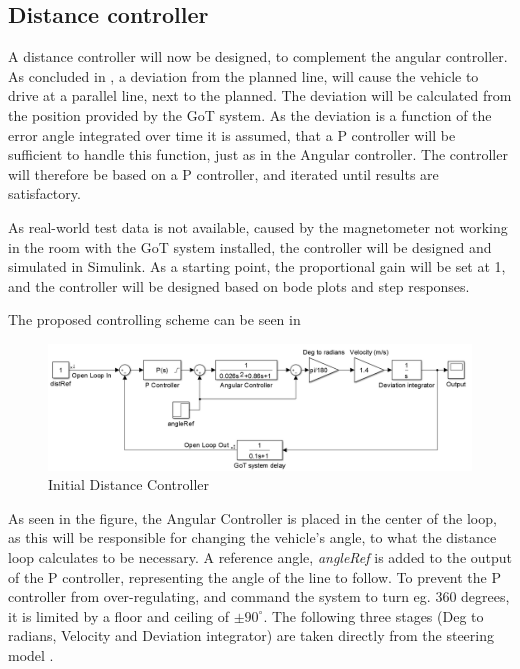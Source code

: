 \subsection{Distance controller}
A distance controller will now be designed, to complement the angular controller.
As concluded in , a deviation from the planned line, will cause the vehicle to drive at a parallel line, next to the planned. The deviation will be calculated from the position provided by the GoT system. As the deviation is a function of the error angle integrated over time it is assumed, that a P controller will be sufficient to handle this function, just as in the Angular controller. The controller will therefore be based on a P controller, and iterated until results are satisfactory. 

As real-world test data is not available, caused by the magnetometer not working in the room with the GoT system installed, the controller will be designed and simulated in Simulink. As a starting point, the proportional gain will be set at 1, and the controller will be designed based on bode plots and step responses.

The proposed controlling scheme can be seen in 

\begin{figure}[H]
\centering
\includegraphics[width=\textwidth]{figures/SteeringSimulink1.png} 
\caption{Initial Distance Controller}
\label{SteeringSimulink}
\end{figure}
As seen in the figure, the Angular Controller is placed in the center of the loop, as this will be responsible for changing the vehicle's angle, to what the distance loop calculates to be necessary. A reference angle, \emph{angleRef} is added to the output of the P controller, representing the angle of the line to follow. To prevent the P controller from over-regulating, and command the system to turn eg. 360 degrees, it is limited by a floor and ceiling of $\pm 90^\circ$. The following three stages (Deg to radians, Velocity and Deviation integrator) are taken directly from the steering model .

